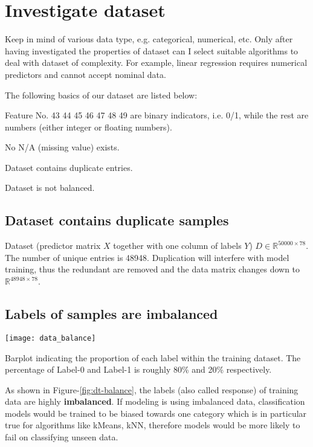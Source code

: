 \section{Investigate dataset}

Keep in mind of various data type, e.g. categorical, numerical, etc. Only after having investigated the properties of dataset can I select suitable algorithms to deal with dataset of complexity. For example, linear regression requires numerical predictors and cannot accept nominal data. 

The following basics of our dataset are listed below: 
\begin{enumerate*}[label=(\roman*)]
	\item Feature No. 43 44 45 46 47 48 49  are binary indicators, i.e. 0/1,  while the rest are numbers (either integer or floating numbers).
	\item No N/A (missing value) exists. 
	\item Dataset contains duplicate entries. 
	\item Dataset is not balanced.
\end{enumerate*}

\subsection{Dataset contains duplicate samples}
Dataset (predictor matrix $X$ together with one column of labels $Y$) $D \in \mathbb{R}^{50000\times 78}$. The number of unique entries is 48948. Duplication will interfere with model training, thus the redundant are removed and the data matrix changes down to $\mathbb{R}^{48948\times 78}$. 

\subsection{Labels of samples are imbalanced}
\begin{marginfigure}
\centering
	\texttt{[image: data\_balance]}
	\caption{Barplot indicating the proportion of each label within the training dataset. The percentage of Label-0 and Label-1 is roughly 80\% and 20\% respectively.}
	\label{fig:dt-balance}
\end{marginfigure}

As shown in Figure-\ref{fig:dt-balance}, the labels (also called response) of training data are highly \textbf{imbalanced}. If modeling is using imbalanced data, classification models would be trained to be biased towards one category which is in particular true for algorithms like kMeans, kNN, therefore models would be more likely to fail on classifying unseen data. 

